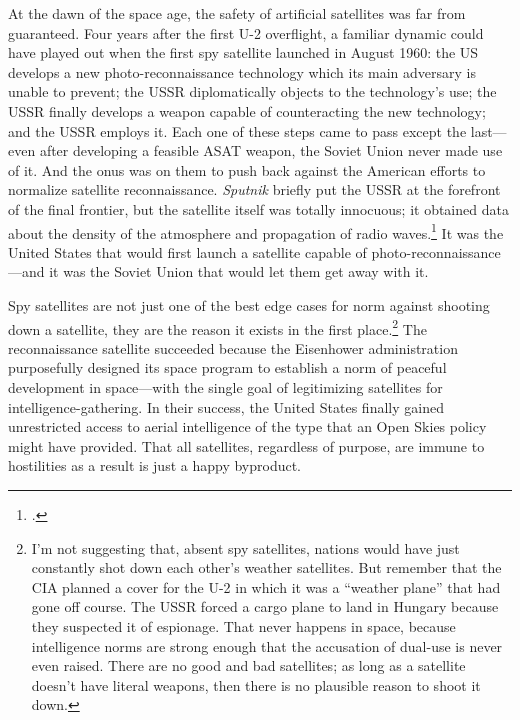 \documentclass{report}
\begin{document}
At the dawn of the space age, the safety of artificial satellites was far from guaranteed. Four years after the first U-2 overflight, a familiar dynamic could have played out when the first spy satellite launched in August 1960: the US develops a new photo-reconnaissance technology which its main adversary is unable to prevent; the USSR diplomatically objects to the technology's use; the USSR finally develops a weapon capable of counteracting the new technology; and the USSR employs it. Each one of these steps came to pass except the last---even after developing a feasible ASAT weapon, the Soviet Union never made use of it. And the onus was on them to push back against the American efforts to normalize satellite reconnaissance. \emph{Sputnik} briefly put the USSR at the forefront of the final frontier, but the satellite itself was totally innocuous; it obtained data about the density of the atmosphere and propagation of radio waves.\footcite{nasa_sputnik_2019} It was the United States that would first launch a satellite capable of photo-reconnaissance---and it was the Soviet Union that would let them get away with it.

Spy satellites are not just one of the best edge cases for norm against shooting down a satellite, they are the reason it exists in the first place.\footnote{I'm not suggesting that, absent spy satellites, nations would have just constantly shot down each other's weather satellites. But remember that the CIA planned a cover for the U-2 in which it was a ``weather plane'' that had gone off course. The USSR forced a cargo plane to land in Hungary because they suspected it of espionage. That never happens in space, because intelligence norms are strong enough that the accusation of dual-use is never even raised. There are no good and bad satellites; as long as a satellite doesn't have literal weapons, then there is no plausible reason to shoot it down.} The reconnaissance satellite succeeded because the Eisenhower administration purposefully designed its space program to establish a norm of peaceful development in space---with the single goal of legitimizing satellites for intelligence-gathering. In their success, the United States finally gained unrestricted access to aerial intelligence of the type that an Open Skies policy might have provided. That all satellites, regardless of purpose, are immune to hostilities as a result is just a happy byproduct.
\end{document}
